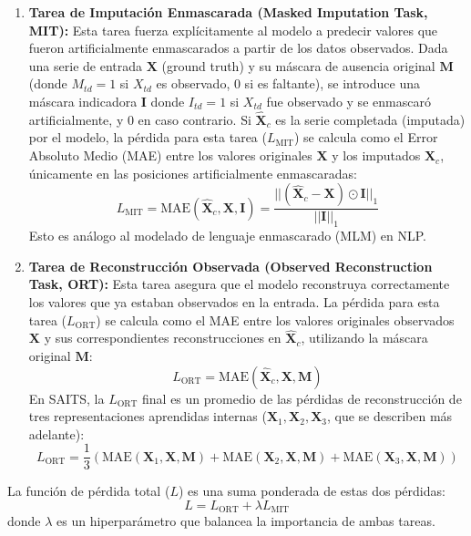 \begin{enumerate}
     \item \textbf{Tarea de Imputación Enmascarada (Masked Imputation Task, MIT):}
    Esta tarea fuerza explícitamente al modelo a predecir valores que fueron artificialmente enmascarados a partir de los datos observados. Dada una serie de entrada $\mathbf{X}$ (ground truth) y su máscara de ausencia original $\mathbf{M}$ (donde $M_{td}=1$ si $X_{td}$ es observado, $0$ si es faltante), se introduce una máscara indicadora $\mathbf{I}$ donde $I_{td}=1$ si $X_{td}$ fue observado y se enmascaró artificialmente, y $0$ en caso contrario. Si $\hat{\mathbf{X}}_c$ es la serie completada (imputada) por el modelo, la pérdida para esta tarea ($L_{\text{MIT}}$) se calcula como el Error Absoluto Medio (MAE) entre los valores originales $\mathbf{X}$ y los imputados $\hat{\mathbf{X}}_c$, únicamente en las posiciones artificialmente enmascaradas:
    \begin{equation}
    L_{\text{MIT}} = \text{MAE}(\hat{\mathbf{X}}_c, \mathbf{X}, \mathbf{I}) = \frac{|| (\hat{\mathbf{X}}_c - \mathbf{X}) \odot \mathbf{I} ||_1}{|| \mathbf{I} ||_1}
    \label{eq:saits_l_mit_norma_consistente}
    \end{equation}
    Esto es análogo al modelado de lenguaje enmascarado (MLM) en NLP.
    \item \textbf{Tarea de Reconstrucción Observada (Observed Reconstruction Task, ORT):}
    Esta tarea asegura que el modelo reconstruya correctamente los valores que ya estaban observados en la entrada. La pérdida para esta tarea ($L_{\text{ORT}}$) se calcula como el MAE entre los valores originales observados $\mathbf{X}$ y sus correspondientes reconstrucciones en $\hat{\mathbf{X}}_c$, utilizando la máscara original $\mathbf{M}$:
    \begin{equation}
    L_{\text{ORT}} = \text{MAE}(\hat{\mathbf{X}}_c, \mathbf{X}, \mathbf{M})
    \label{eq:saits_l_ort_individual} %
    \end{equation}
    En SAITS, la $L_{\text{ORT}}$ final es un promedio de las pérdidas de reconstrucción de tres representaciones aprendidas internas ($\mathbf{X}_1, \mathbf{X}_2, \mathbf{X}_3$, que se describen más adelante):
    \begin{equation}
    L_{\text{ORT}} = \frac{1}{3} \left( \text{MAE}(\mathbf{X}_1, \mathbf{X}, \mathbf{M}) + \text{MAE}(\mathbf{X}_2, \mathbf{X}, \mathbf{M}) + \text{MAE}(\mathbf{X}_3, \mathbf{X}, \mathbf{M}) \right)
    \label{eq:saits_l_ort_total}
    \end{equation}
\end{enumerate}
La función de pérdida total ($L$) es una suma ponderada de estas dos pérdidas:
\begin{equation}
L = L_{\text{ORT}} + \lambda L_{\text{MIT}}
\label{eq:saits_l_total}
\end{equation}
donde $\lambda$ es un hiperparámetro que balancea la importancia de ambas tareas.

